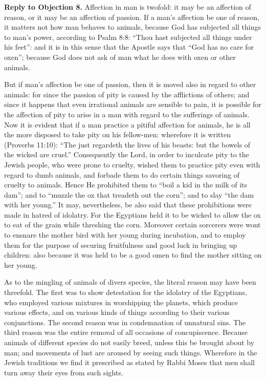 \textbf{Reply to Objection 8.} Affection in man is twofold: it may be an affection of reason, or it may be an affection of passion. If a man's affection be one of reason, it matters not how man behaves to animals, because God has subjected all things to man's power, according to Psalm 8:8: ``Thou hast subjected all things under his feet'': and it is in this sense that the Apostle says that ``God has no care for oxen''; because God does not ask of man what he does with oxen or other animals.

But if man's affection be one of passion, then it is moved also in regard to other animals: for since the passion of pity is caused by the afflictions of others; and since it happens that even irrational animals are sensible to pain, it is possible for the affection of pity to arise in a man with regard to the sufferings of animals. Now it is evident that if a man practice a pitiful affection for animals, he is all the more disposed to take pity on his fellow-men: wherefore it is written (Proverbs 11:10): ``The just regardeth the lives of his beasts: but the bowels of the wicked are cruel.'' Consequently the Lord, in order to inculcate pity to the Jewish people, who were prone to cruelty, wished them to practice pity even with regard to dumb animals, and forbade them to do certain things savoring of cruelty to animals. Hence He prohibited them to ``boil a kid in the milk of its dam''; and to ``muzzle the ox that treadeth out the corn''; and to slay ``the dam with her young.'' It may, nevertheless, be also said that these prohibitions were made in hatred of idolatry. For the Egyptians held it to be wicked to allow the ox to eat of the grain while threshing the corn. Moreover certain sorcerers were wont to ensnare the mother bird with her young during incubation, and to employ them for the purpose of securing fruitfulness and good luck in bringing up children: also because it was held to be a good omen to find the mother sitting on her young.

As to the mingling of animals of divers species, the literal reason may have been threefold. The first was to show detestation for the idolatry of the Egyptians, who employed various mixtures in worshipping the planets, which produce various effects, and on various kinds of things according to their various conjunctions. The second reason was in condemnation of unnatural sins. The third reason was the entire removal of all occasions of concupiscence. Because animals of different species do not easily breed, unless this be brought about by man; and movements of lust are aroused by seeing such things. Wherefore in the Jewish traditions we find it prescribed as stated by Rabbi Moses that men shall turn away their eyes from such sights.


